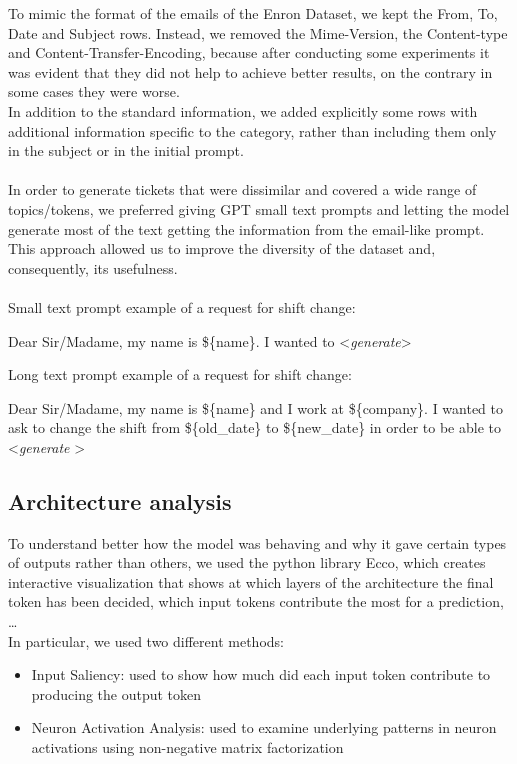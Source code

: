 To mimic the format of the emails of the Enron Dataset, we kept the From, To, Date and Subject rows. Instead, we removed the Mime-Version, the Content-type and Content-Transfer-Encoding, because after conducting some experiments it was evident that they did not help to achieve better results, on the contrary in some cases they were worse. \\
In addition to the standard information, we added explicitly some rows with additional information specific to the category, rather than including them only in the subject or in the initial prompt. \\
\\
In order to generate tickets that were dissimilar and covered a wide range of topics/tokens, we preferred giving GPT small text prompts and letting the model generate most of the text getting the information from the email-like prompt. This approach allowed us to improve the diversity of the dataset and, consequently, its usefulness. \\
\\
Small text prompt example of a request for shift change:
\begin{adjustwidth}{1cm}{}
    Dear Sir/Madame, my name is \$\{name\}. I wanted to \textless \textit{generate}\textgreater
\end{adjustwidth}

Long text prompt example of a request for shift change:
\begin{adjustwidth}{1cm}{}
    Dear Sir/Madame, my name is \$\{name\} and I work at \$\{company\}. I wanted to ask to change the shift from \$\{old\_date\} to \$\{new\_date\} in order to be able to \textless \textit{generate} \textgreater
\end{adjustwidth}

\subsection*{Architecture analysis}
To understand better how the model was behaving and why it gave certain types of outputs rather than others, we used the python library Ecco, which creates interactive visualization that shows at which layers of the architecture the final token has been decided, which input tokens contribute the most for a prediction, \dots \\
In particular, we used two different methods:
\begin{itemize}
    \item Input Saliency: used to show how much did each input token contribute to producing the output token
    \item Neuron Activation Analysis: used to examine underlying patterns in neuron activations using non-negative matrix factorization
\end{itemize}
